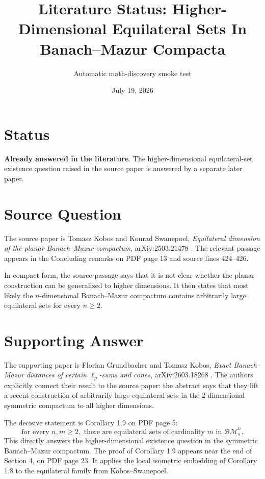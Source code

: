 \documentclass[11pt]{article}
\title{Literature Status: Higher-Dimensional Equilateral Sets In Banach--Mazur Compacta}
\author{Automatic math-discovery smoke test}
\date{July 19, 2026}
\newcommand{\BM}{\mathcal{BM}}
\begin{document}
\maketitle

\section*{Status}

\textbf{Already answered in the literature}.  The higher-dimensional
equilateral-set existence question raised in the source paper is answered by a
separate later paper.

\section*{Source Question}

The source paper is Tomasz Kobos and Konrad Swanepoel,
\emph{Equilateral dimension of the planar Banach--Mazur compactum},
arXiv:2503.21478 \cite{KobosSwanepoel2025}.  The relevant passage appears in
the Concluding remarks on PDF page 13 and source lines 424--426.

In compact form, the source passage says that it is not clear whether the
planar construction can be generalized to higher dimensions.  It then states
that most likely the \(n\)-dimensional Banach--Mazur compactum contains
arbitrarily large equilateral sets for every \(n\ge2\).

\section*{Supporting Answer}

The supporting paper is Florian Grundbacher and Tomasz Kobos,
\emph{Exact Banach--Mazur distances of certain \(\ell_p\)-sums and cones},
arXiv:2603.18268 \cite{GrundbacherKobos2026}.  The authors explicitly connect
their result to the source paper: the abstract says that they lift a recent
construction of arbitrarily large equilateral sets in the \(2\)-dimensional
symmetric compactum to all higher dimensions.

The decisive statement is Corollary 1.9 on PDF page 5:
\[
  \text{for every } n,m\ge2,\text{ there are equilateral sets of cardinality }
  m \text{ in } \BM_s^n.
\]
This directly answers the higher-dimensional existence question in the
symmetric Banach--Mazur compactum.  The proof of Corollary 1.9 appears near the
end of Section 4, on PDF page 23.  It applies the local isometric embedding of
Corollary 1.8 to the equilateral family from Kobos--Swanepoel.
\end{document}
